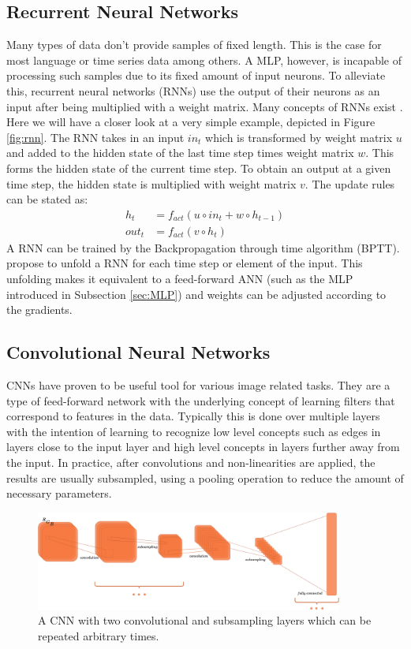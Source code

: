\documentclass[a4paper,cleardoubleempty,BCOR1cm, 11pt]{report}
\begin{document}
\subsection{Recurrent Neural Networks}
Many types of data don't provide samples of fixed length. This is the case for most language or time series data among others. A MLP, however, is incapable of processing such samples due to its fixed amount of input neurons. To alleviate this, recurrent neural networks (RNNs) use the output of their neurons as an input after being multiplied with a weight matrix. Many concepts of RNNs exist \cite{Grossberg:2013}. Here we will have a closer look at a very simple example, depicted in Figure \ref{fig:rnn}.
The  RNN takes in an input $in_t$ which is transformed by weight matrix $u$ and added to the hidden state of the last time step times weight matrix $w$. This forms the hidden state of the current time step. To obtain an output at a given time step, the hidden state is multiplied with weight matrix $v$. The update rules can be stated as:
\begin{align}
	h_t &= f_{act}(u \circ in_t + w \circ h_{t-1})\\
	out_t &=f_{act}(v \circ h_t)
\end{align}
A RNN can be trained by the Backpropagation through time algorithm (BPTT). \citet{werbos1990backpropagation} propose to unfold a RNN for each time step or element of the input. This unfolding makes it equivalent to a feed-forward ANN (such as the MLP introduced in Subsection \ref{sec:MLP}) and weights can be adjusted according to the gradients.


\subsection{Convolutional Neural Networks}
CNNs have proven to be useful tool for various image related tasks. They are a type of feed-forward network with the underlying concept of learning filters that correspond to features in the data. Typically this is done over multiple layers with the intention of learning to recognize low level concepts such as edges in layers close to the input layer and high level concepts in layers further away from the input. In practice, after convolutions and non-linearities are applied, the results are usually subsampled, using a pooling operation to reduce the amount of necessary parameters.

\begin{figure}
	\centering
		\includegraphics[width=0.9\textwidth]{images/convnet.pdf} 
		\caption{A CNN with two convolutional and subsampling layers which can be repeated arbitrary times.}
		\label{fig:convnet}
\end{figure}
\end{document}
